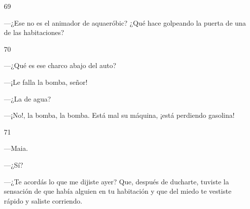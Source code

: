 \documentclass[12pt,twoside,openright,a5paper]{book}
\begin{document}
\vspace{0.5cm}
\afterpage{}
\hrulefill \hspace{0.1cm}\decofourleft\hspace{0.2cm} 69 \hspace{0.2cm}\decofourright \hspace{0.1cm}\hrulefill

\nopagebreak

\vspace{0.5cm}

\nopagebreak

---¿Ese no es el animador de aquaeróbic? ¿Qué hace golpeando la puerta
de una de las habitaciones?

\vspace{0.5cm}

\hrulefill \hspace{0.1cm}\decofourleft\hspace{0.2cm} 70 \hspace{0.2cm}\decofourright \hspace{0.1cm}\hrulefill

\nopagebreak

\vspace{0.5cm}

\nopagebreak

---¿Qué es ese charco abajo del auto?

---¡Le falla la bomba, señor!

---¿La de agua?

---¡No!, la bomba, la bomba. Está mal su máquina, ¡está perdiendo gasolina!

\vspace{0.5cm}

\hrulefill \hspace{0.1cm}\decofourleft\hspace{0.2cm} 71 \hspace{0.2cm}\decofourright \hspace{0.1cm}\hrulefill

\nopagebreak

\vspace{0.5cm}

\nopagebreak

---Maia.

---¿Sí?

---¿Te acordás lo que me dijiste ayer? Que, después de ducharte, tuviste la sensación de que había
alguien en tu habitación y que del miedo te vestiste
rápido y saliste corriendo.
\end{document}
